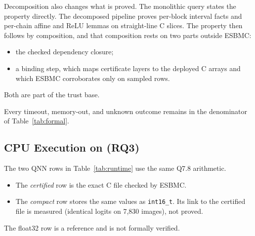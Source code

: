 Decomposition also changes what is proved. The monolithic query states the property directly. The decomposed pipeline proves per-block interval facts and per-chain affine and ReLU lemmas on straight-line C slices. The property then follows by composition, and that composition rests on two parts outside ESBMC:
\begin{itemize}
  \item the checked dependency closure;
  \item a binding step, which maps certificate layers to the deployed C arrays and which ESBMC corroborates only on sampled rows.
\end{itemize}
Both are part of the trust base.

Every timeout, memory-out, and unknown outcome remains in the denominator of Table~\ref{tab:formal}.

\subsection{CPU Execution on \AAOS{} (RQ3)}
The two QNN rows in Table~\ref{tab:runtime} use the same Q7.8 arithmetic.
\begin{itemize}
  \item The \emph{certified} row is the exact C file checked by ESBMC.
  \item The \emph{compact} row stores the same values as \texttt{int16\_t}. Its link to the certified file is measured (identical logits on 7,830 images), not proved.
\end{itemize}
The float32 row is a reference and is not formally verified.

\begin{table}[t]
\centering
\caption{Deployment measurements on the VIM3 under \AAOS{} (7,830 validation images, one thread, pinned to the \Aseven{} cluster). RSS is peak resident memory for a 1-image run. n.m.: not measured.}
\label{tab:runtime}
\scriptsize
{}%
\end{table}

